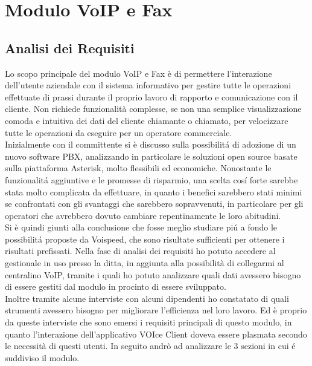 


\chapter{Modulo VoIP e Fax}
\section{Analisi dei Requisiti}

Lo scopo principale del modulo VoIP e Fax \`e di permettere l'interazione dell'utente aziendale con il sistema informativo per gestire tutte le operazioni effettuate di prassi durante il proprio lavoro di rapporto e comunicazione con il cliente. Non richiede funzionalit\`a complesse, se non una semplice visualizzazione comoda e intuitiva dei dati del cliente chiamante o chiamato, per velocizzare tutte le operazioni da eseguire per un operatore commerciale. \\
Inizialmente con il committente si \`e discusso sulla possibilit\'a di adozione di un nuovo software PBX, analizzando in particolare le soluzioni open source basate sulla piattaforma Asterisk, molto flessibili ed economiche. Nonostante le funzionalit\'a aggiuntive e le promesse di risparmio, una scelta cos\'i forte sarebbe stata molto complicata da effettuare, in quanto i benefici sarebbero stati minimi se confrontati con gli svantaggi che sarebbero sopravvenuti, in particolare per gli operatori che avrebbero dovuto cambiare repentinamente le loro abitudini. \\
Si \`e quindi giunti alla conclusione che fosse meglio studiare pi\'u a fondo le possibilit\'a proposte da Voispeed, che sono risultate sufficienti per ottenere i risultati prefissati. Nella fase di analisi dei requisiti ho potuto accedere al gestionale in uso presso la ditta, in aggiunta alla possibilit\`a di collegarmi al centralino VoIP, tramite i quali ho potuto analizzare quali dati avessero bisogno di essere gestiti dal modulo in procinto di essere sviluppato. \\
Inoltre tramite alcune interviste con alcuni dipendenti ho constatato di quali strumenti avessero bisogno per migliorare l'efficienza nel loro lavoro. Ed \`e proprio da queste interviste che sono emersi i requisiti principali di questo modulo, in quanto l'interazione dell'applicativo VOIce Client doveva essere plasmata secondo le necessit\`a di questi utenti. In seguito andr\`o ad analizzare le 3 sezioni in cui \'e suddiviso il modulo.

